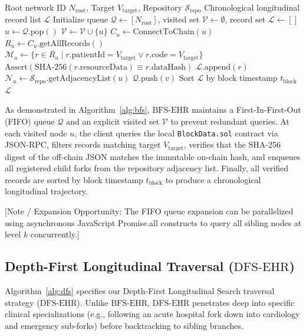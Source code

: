 \begin{algorithm}[t]
\caption{Level-Order Breadth-First Search ($\text{BFS-EHR}$)}
\label{alg:bfs}
\begin{algorithmic}[1]
\REQUIRE Root network ID $N_{\text{root}}$, Target $V_{\text{target}}$, Repository $\mathcal{S}_{\text{repo}}$
\ENSURE Chronological longitudinal record list $\mathcal{L}$
\STATE Initialize queue $\mathcal{Q} \leftarrow [N_{\text{root}}]$, visited set $\mathcal{V} \leftarrow \emptyset$, record set $\mathcal{L} \leftarrow []$
    \STATE $u \leftarrow \mathcal{Q}.\text{pop}()$
        \STATE $\mathcal{V} \leftarrow \mathcal{V} \cup \{u\}$
        \STATE $C_u \leftarrow \text{ConnectToChain}(u)$
        \STATE $R_u \leftarrow C_u.\text{getAllRecords}()$
        \STATE $\mathcal{M}_u \leftarrow \{r \in R_u \mid r.\text{patientId} = V_{\text{target}} \lor r.\text{code} = V_{\text{target}}\}$
            \STATE $\text{Assert}(\text{SHA-256}(r.\text{resourceData}) \equiv r.\text{dataHash})$
            \STATE $\mathcal{L}.\text{append}(r)$
        \ENDFOR
        \STATE $\mathcal{N}_u \leftarrow \mathcal{S}_{\text{repo}}.\text{getAdjacencyList}(u)$
            \STATE $\mathcal{Q}.\text{push}(v)$
        \ENDFOR
    \ENDIF
\ENDWHILE
\STATE Sort $\mathcal{L}$ by block timestamp $t_{\text{block}}$
\RETURN $\mathcal{L}$
\end{algorithmic}
\end{algorithm}

As demonstrated in Algorithm~\ref{alg:bfs}, $\text{BFS-EHR}$ maintains a First-In-First-Out (FIFO) queue $\mathcal{Q}$ and an explicit visited set $\mathcal{V}$ to prevent redundant queries. At each visited node $u$, the client queries the local \texttt{BlockData.sol} contract via JSON-RPC, filters records matching target $V_{\text{target}}$, verifies that the SHA-256 digest of the off-chain JSON matches the immutable on-chain hash, and enqueues all registered child forks from the repository adjacency list. Finally, all verified records are sorted by block timestamp $t_{\text{block}}$ to produce a chronological longitudinal trajectory.

[Note / Expansion Opportunity: The FIFO queue expansion can be parallelized using asynchronous JavaScript Promise.all constructs to query all sibling nodes at level $k$ concurrently.]

\subsection{Depth-First Longitudinal Traversal ($\text{DFS-EHR}$)}
Algorithm~\ref{alg:dfs} specifies our Depth-First Longitudinal Search traversal strategy ($\text{DFS-EHR}$). Unlike $\text{BFS-EHR}$, $\text{DFS-EHR}$ penetrates deep into specific clinical specializations (e.g., following an acute hospital fork down into cardiology and emergency sub-forks) before backtracking to sibling branches.

